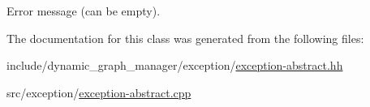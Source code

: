 Error message (can be empty). 



The documentation for this class was generated from the following files\+:\begin{DoxyCompactItemize}
\item 
include/dynamic\+\_\+graph\+\_\+manager/exception/\hyperlink{exception-abstract_8hh}{exception-\/abstract.\+hh}\item 
src/exception/\hyperlink{exception-abstract_8cpp}{exception-\/abstract.\+cpp}\end{DoxyCompactItemize}
